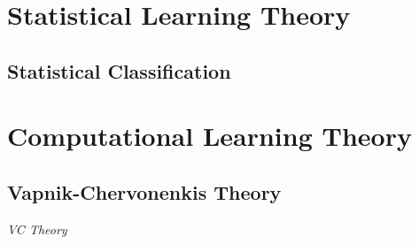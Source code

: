 \section{Statistical Learning Theory}\label{sec:statistical_learning_theory}




\subsection{Statistical Classification}\label{sec:statistical_classification}



\section{Computational Learning Theory}\label{sec:computational_learning_theory}




\subsection{Vapnik-Chervonenkis Theory}\label{sec:vc_theory}

\emph{VC Theory}

